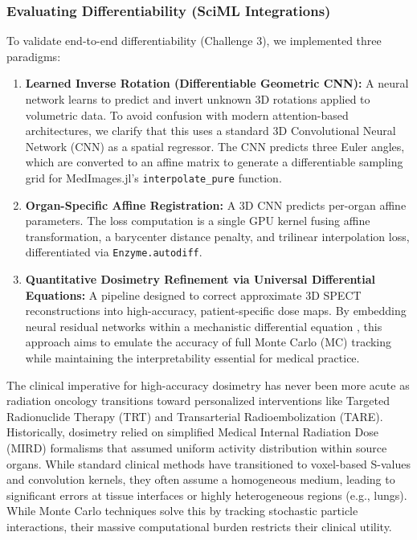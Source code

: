 \documentclass[10pt,letterpaper]{article}
\begin{document}
\subsubsection*{Evaluating Differentiability (SciML Integrations)}
To validate end-to-end differentiability (Challenge 3), we implemented three paradigms:
\begin{enumerate}
    \item \textbf{Learned Inverse Rotation (Differentiable Geometric CNN):} A neural network learns to predict and invert unknown 3D rotations applied to volumetric data. To avoid confusion with modern attention-based architectures, we clarify that this uses a standard 3D Convolutional Neural Network (CNN) as a spatial regressor. The CNN predicts three Euler angles, which are converted to an affine matrix to generate a differentiable sampling grid for MedImages.jl's \texttt{interpolate\_pure} function. 
    \item \textbf{Organ-Specific Affine Registration:} A 3D CNN predicts per-organ affine parameters. The loss computation is a single GPU kernel fusing affine transformation, a barycenter distance penalty, and trilinear interpolation loss, differentiated via \texttt{Enzyme.autodiff}.
    \item \textbf{Quantitative Dosimetry Refinement via Universal Differential Equations:} A pipeline designed to correct approximate 3D SPECT reconstructions into high-accuracy, patient-specific dose maps. By embedding neural residual networks within a mechanistic differential equation \cite{Berman_2024}, this approach aims to emulate the accuracy of full Monte Carlo (MC) tracking while maintaining the interpretability essential for medical practice.
\end{enumerate}

The clinical imperative for high-accuracy dosimetry has never been more acute as radiation oncology transitions toward personalized interventions like Targeted Radionuclide Therapy (TRT) and Transarterial Radioembolization (TARE). Historically, dosimetry relied on simplified Medical Internal Radiation Dose (MIRD) formalisms that assumed uniform activity distribution within source organs. While standard clinical methods have transitioned to voxel-based S-values and convolution kernels, they often assume a homogeneous medium, leading to significant errors at tissue interfaces or highly heterogeneous regions (e.g., lungs). While Monte Carlo techniques solve this by tracking stochastic particle interactions, their massive computational burden restricts their clinical utility.
\end{document}
